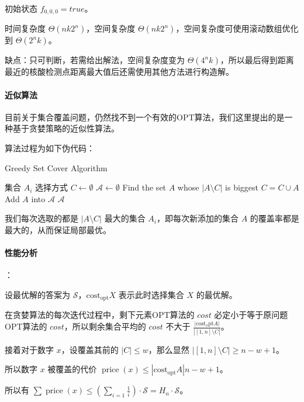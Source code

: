 \documentclass{cumcmthesis}
\begin{document}
初始状态 $f_{0,0,0} = true$。

时间复杂度 $\Theta(nk2^n)$，空间复杂度 $\Theta(nk2^n)$，空间复杂度可使用滚动数组优化到 $\Theta(2^nk)$。

缺点：只可判断，若需给出解法，空间复杂度变为 $\Theta(4^nk)$，所以最后得到距离最近的核酸检测点距离最大值后还需使用其他方法进行构造解。

\paragraph{近似算法}

目前关于集合覆盖问题，仍然找不到一个有效的OPT算法，我们这里提出的是一种基于贪婪策略的近似性算法。

算法过程为如下伪代码：

\begin{algorithm}
    \caption{Greedy Set Cover Algorithm}
    \begin{algorithmic}[1]
        \Require 集合 $A_i$
        \Ensure 选择方式
        \State $C \gets \emptyset$
        \State $\mathscr{A} \gets \emptyset$
            \State Find the set $A$ whose $|A\setminus C|$ is biggest
            \State $C = C \cup A$
            \State Add $A$ into $\mathscr{A}$
        \EndWhile
        \State \Return $\mathscr{A}$
    \end{algorithmic}
\end{algorithm}

我们每次选取的都是 $|A\setminus C|$ 最大的集合 $A_i$，即每次新添加的集合 $A$ 的覆盖率都是最大的，从而保证局部最优。

\paragraph{性能分析}：

设最优解的答案为 $\mathscr{S}$，$\operatorname{cost_{opt}}X$ 表示此时选择集合 $X$ 的最优解。

在贪婪算法的每次迭代过程中，剩下元素OPT算法的 $cost$ 必定小于等于原问题OPT算法的 $cost$，所以剩余集合平均的 $cost$ 不大于 $\frac{|\operatorname{cost_opt}A|}{|[1,n]\setminus C|}$。

接着对于数字 $x$，设覆盖其前的 $|C| \le w$，那么显然 $|[1,n]\setminus C| \ge n - w + 1$。

所以数字 $x$ 被覆盖的代价 $\operatorname{price}(x) \le {|\operatorname{cost_{opt}}A|}{n-w+1}$。

所以有 $\sum \operatorname{price}(x) \le (\sum_{i=1}\frac{1}{i}) \cdot \mathscr{S} = H_n \cdot \mathscr{S}$。
\end{document}
